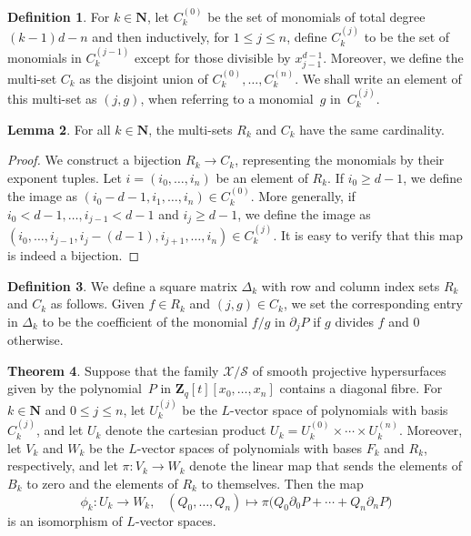 \documentclass[a4paper,11pt]{article}
\numberwithin{equation}{section}
\newcommand{\NN}{\mathbf{N}} %
\newcommand{\ZZ}{\mathbf{Z}} %
\renewcommand{\to}{\rightarrow}        %
\theoremstyle{definition}
\newtheorem{thm}{Theorem}[section]
\newtheorem{lem}[thm]{Lemma}
\newtheorem{defn}[thm]{Definition}
\begin{document}
\begin{defn} \label{defn:IndexSets}
For $k \in \NN$, let $C_k^{(0)}$ be the set of monomials of total 
degree $(k-1)d - n$ and then inductively, for $1 \leq j \leq n$, define 
$C_k^{(j)}$ to be the set of monomials in $C_k^{(j-1)}$ except for those 
divisible by $x_{j-1}^{d-1}$.  Moreover, we define the multi-set $C_k$ as 
the disjoint union of $C_k^{(0)}, \dotsc, C_k^{(n)}$.  We shall write an 
element of this multi-set as $(j, g)$, when referring to a monomial~$g$ 
in~$C_k^{(j)}$.
\end{defn}

\begin{lem} \label{lem:bijection}
For all $k \in \NN$, the multi-sets $R_k$ and $C_k$ 
have the same cardinality.
\end{lem}

\begin{proof}
We construct a bijection $R_k \to C_k$, representing the 
monomials by their exponent tuples.  Let $i = (i_0, \dotsc, i_n)$ be an
element of $R_k$.  If $i_0 \geq d-1$, we define the image as
$(i_0-d-1, i_1, \dotsc, i_n) \in C_k^{(0)}$.  More generally, if 
$i_0 < d-1, \dotsc, i_{j-1} < d-1$ and $i_j \geq d-1$, we define the image as 
$(i_0, \dotsc, i_{j-1}, i_j-(d-1), i_{j+1}, \dotsc, i_n) \in C_k^{(j)}$.  
It is easy to verify that this map is indeed a bijection.
\end{proof}

\begin{defn} \label{defn:Deltak}
We define a square matrix $\Delta_k$ with 
row and column index sets $R_k$ and $C_k$ as follows.  
Given $f \in R_k$ and $(j,g) \in C_k$, we set the corresponding entry in 
$\Delta_k$ to be the coefficient of the monomial $f/g$ in $\partial_j P$ if 
$g$ divides $f$ and $0$ otherwise.
\end{defn}

\begin{thm} \label{thm:Isomorphism}
Suppose that the family $\mathcal{X}/\mathcal{S}$ of smooth projective
hypersurfaces given by the polynomial~$P$ in $\ZZ_q[t][x_0, \dotsc, x_n]$ contains 
a diagonal fibre.  For $k \in \NN$ and $0 \leq j \leq n$, let $U_k^{(j)}$ be 
the $L$-vector space of polynomials with basis $C_k^{(j)}$, and let $U_k$ 
denote the cartesian product $U_k = U_k^{(0)} \times \dotsb \times U_k^{(n)}$. 
Moreover, let $V_k$ and $W_k$ be the $L$-vector spaces of polynomials with 
bases $F_k$ and $R_k$, respectively, and let $\pi \colon V_k \rightarrow W_k$ 
denote the linear map that sends the elements of $B_k$ to zero and the 
elements of $R_k$ to themselves. %
Then the map 
\begin{equation}
\phi_k \colon U_k \to W_k, \;\;\;
(Q_0, \dotsc, Q_n) \mapsto \pi \bigl( Q_0 \partial_0 P + \dotsb + Q_n \partial_n P \bigr)
\end{equation}
is an isomorphism of $L$-vector spaces.
\end{thm}
\end{document}
